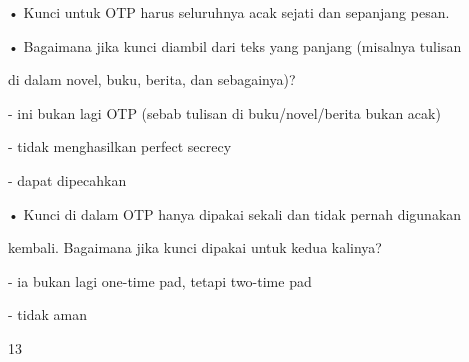 \documentclass{article}
\begin{document}

• Kunci untuk OTP harus seluruhnya acak sejati dan sepanjang pesan.

• Bagaimana jika kunci diambil dari teks yang panjang (misalnya tulisan 

di dalam novel, buku, berita, dan sebagainya)?

   - ini bukan lagi OTP  (sebab tulisan di buku/novel/berita bukan acak)

   - tidak menghasilkan perfect secrecy

   - dapat dipecahkan

• Kunci di dalam OTP hanya dipakai sekali dan tidak pernah digunakan 

kembali. Bagaimana jika kunci dipakai untuk kedua kalinya?

   - ia bukan lagi one-time pad, tetapi two-time pad

   - tidak aman 

13
\end{document}
